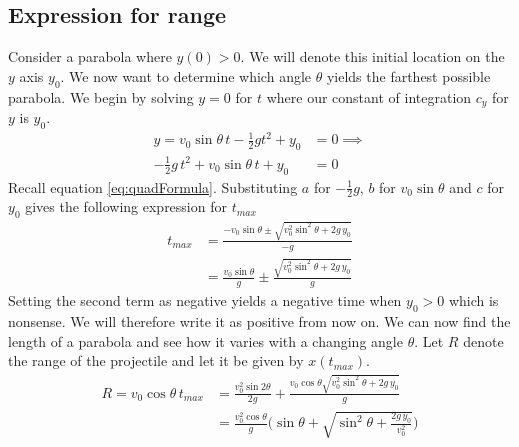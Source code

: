 \documentclass[%
aip,
jmp,
amsmath,amssymb,
reprint,%
]{revtex4-1}
\begin{document}
	\subsection{Expression for range}
	Consider a parabola where $y(0) > 0$. We will denote this initial location on the $y$ axis $y_0$. We now want to determine which angle $\theta$ yields the farthest possible parabola. We begin by solving $y=0$ for $t$ where our constant of integration $c_y$ for $y$ is $y_0$.
	\begin{align}\nonumber
		y=v_0\sin\theta\,t - \frac12gt^2 + y_0 &= 0 \implies\\\nonumber
		-\frac12g\,t^2+v_0\sin\theta\,t+y_0 &= 0
	\end{align}
	Recall equation \eqref{eq:quadFormula}. Substituting $a$ for $-\frac12g$, $b$ for $v_0\sin\theta$ and $c$ for $y_0$ gives the following expression for $t_{max}$
	\begin{align}\nonumber
		t_{max} &= \frac{-v_0\sin\theta\pm\sqrt{v_{0}^2\sin^2\theta+2g\,y_0}}{-g}\\\label{eq:tMaxFromHeight}
		&=\frac{v_0\sin\theta}{g}\pm\frac{\sqrt{v_{0}^2\sin^2\theta+2g\,y_0}}{g}
	\end{align}
	Setting the second term as negative yields a negative time when $y_0 > 0$ which is nonsense. We will therefore write it as positive from now on. We can now find the length of a parabola and see how it varies with a changing angle $\theta$. Let $R$ denote the range of the projectile and let it be given by $x(t_{max})$.
	\begin{align}\nonumber
		R = v_0\cos\theta\,t_{max} &= \frac{v_{0}^2\sin2\theta}{2g}+ \frac{v_0\cos\theta\sqrt{v_{0}^2\sin^2\theta+2g\,y_0}}{g} \\\nonumber
		&=\frac{v_{0}^2\cos\theta}{g}\Big(\sin\theta+\sqrt{\sin^2\theta+\frac{2g\,y_0}{v_{0}^2}}\Big)
	\end{align}
\end{document}
